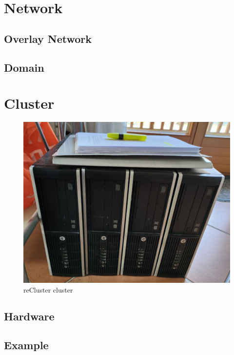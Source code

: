 \section{Network}
\label{sec:architecture_network}

\subsection{Overlay Network}
\label{subsec:architecture_network_overlay_network}

\subsection{Domain}
\label{subsec:architecture_network_domain}

\section{Cluster}
\label{sec:architecture_cluster}

\begin{figure}
  \centering
  \includegraphics[width=.5\textwidth]{images/recluster/cluster.png}
  \caption{reCluster cluster}
\end{figure}

\subsection{Hardware}
\label{subsec:architecture_cluster_hardware}


\subsection{Example}
\label{subsec:architecture_cluster_example}

